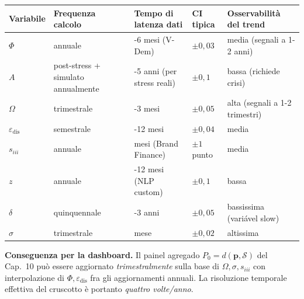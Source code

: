 {\def\LTcaptype{none} %
{\small\begin{longtable}[]{@{}
  >{\raggedright\arraybackslash}p{}
  >{\raggedright\arraybackslash}p{}
  >{\raggedright\arraybackslash}p{}
  >{\raggedright\arraybackslash}p{}
  >{\raggedright\arraybackslash}p{}@{}}
\toprule\noalign{}
\begin{minipage}[b]{\linewidth}\raggedright
Variabile
\end{minipage} & \begin{minipage}[b]{\linewidth}\raggedright
Frequenza calcolo
\end{minipage} & \begin{minipage}[b]{\linewidth}\raggedright
Tempo di latenza dati
\end{minipage} & \begin{minipage}[b]{\linewidth}\raggedright
CI tipica
\end{minipage} & \begin{minipage}[b]{\linewidth}\raggedright
Osservabilità del trend
\end{minipage} \\
\midrule\noalign{}
\endhead
\bottomrule\noalign{}
\endlastfoot
\(\Phi\) & annuale & 4-6 mesi (V-Dem) & \(\pm 0{,}03\) & media (segnali
a 1-2 anni) \\
\(A\) & post-stress + simulato annualmente & 3-5 anni (per stress reali)
& \(\pm 0{,}1\) & bassa (richiede crisi) \\
\(\Omega\) & trimestrale & 2-3 mesi & \(\pm 0{,}05\) & alta (segnali a
1-2 trimestri) \\
\(\varepsilon_{\text{dis}}\) & semestrale & 6-12 mesi & \(\pm 0{,}04\) &
media \\
\(s_{iii}\) & annuale & 3 mesi (Brand Finance) & \(\pm 1\) punto &
media \\
\(z\) & annuale & 6-12 mesi (NLP custom) & \(\pm 0{,}1\) & bassa \\
\(\delta\) & quinquennale & 1-3 anni & \(\pm 0{,}05\) & bassissima
(variável slow) \\
\(\sigma\) & trimestrale & 1 mese & \(\pm 0{,}02\) & altissima \\
\end{longtable}}
}

\Hypoth{} \textbf{Conseguenza per la dashboard.} Il painel agregado
\(P_0 = d(\boldsymbol{p}, \mathcal{S})\) del Cap.~10 può essere
aggiornato \emph{trimestralmente} sulla base di
\(\Omega, \sigma, s_{iii}\) con interpolazione di
\(\Phi, \varepsilon_{\text{dis}}\) fra gli aggiornamenti annuali. La
risoluzione temporale effettiva del cruscotto è portanto \emph{quattro
volte/anno}.



